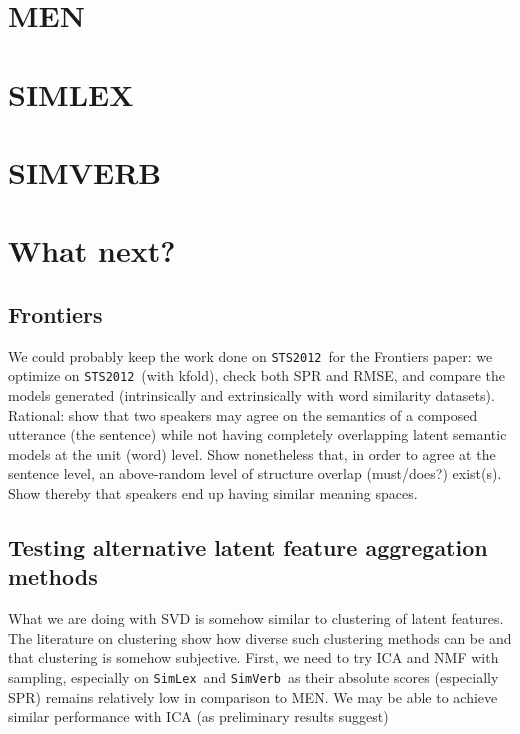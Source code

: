 \documentclass[utf8]{article}
\newcommand\simlex{\texttt{SimLex}}
\newcommand\simverb{\texttt{SimVerb}}
\newcommand\sts{\texttt{STS2012}}
\begin{document}
\section{MEN}



\section{SIMLEX}



\section{SIMVERB}



\section{What next?}

\subsection{Frontiers}
We could probably keep the work done on \sts\ for the Frontiers paper: we optimize on \sts\ (with kfold), check both SPR and RMSE, and compare the models generated (intrinsically and extrinsically with word similarity datasets).
Rational: show that two speakers may agree on the semantics of a composed utterance (the sentence) while not having completely overlapping latent semantic models at the unit (word) level. Show nonetheless that, in order to agree at the sentence level, an above-random level of structure overlap (must/does?) exist(s). Show thereby that speakers end up having similar meaning spaces.

\subsection{Testing alternative latent feature aggregation methods}
What we are doing with SVD is somehow similar to clustering of latent features.
The literature on clustering show how diverse such clustering methods can be and that clustering is somehow subjective. First, we need to try ICA and NMF with sampling, especially on \simlex\ and \simverb\ as their absolute scores (especially SPR) remains relatively low in comparison to MEN. We may be able to achieve similar performance with ICA (as preliminary results suggest)
\end{document}
